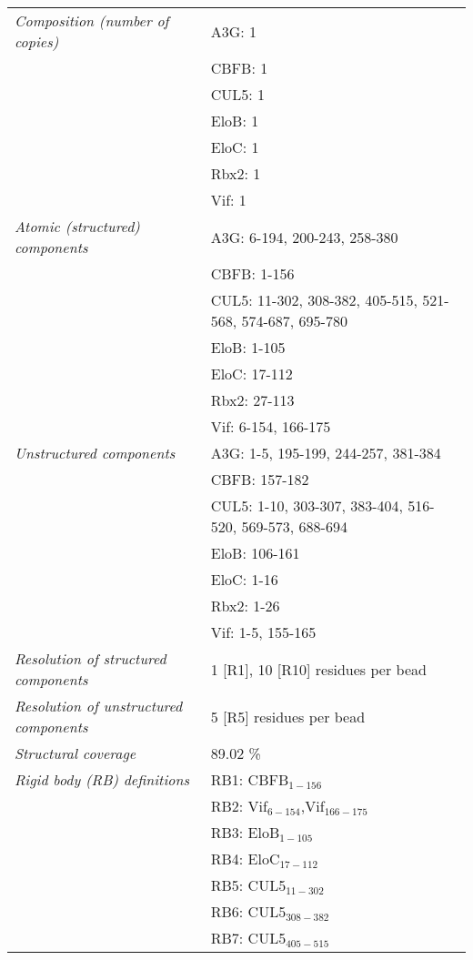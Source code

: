 \documentclass[8pt,a4paper]{article}
\begin{document}
\begin{longtable}{ p{} | p{} }
            \textit{Composition (number of copies)} & A3G: 1\\
            & CBFB: 1 \\
            & CUL5: 1 \\
            & EloB: 1 \\
            & EloC: 1 \\
            & Rbx2: 1 \\
            & Vif: 1 \\
                \textit{Atomic (structured) components} & A3G: 6-194, 200-243, 258-380\\
            & CBFB: 1-156 \\
            & CUL5: 11-302, 308-382, 405-515, 521-568, 574-687, 695-780 \\
            & EloB: 1-105 \\
            & EloC: 17-112 \\
            & Rbx2: 27-113 \\
            & Vif: 6-154, 166-175 \\
                \textit{Unstructured components} & A3G: 1-5, 195-199, 244-257, 381-384\\
            & CBFB: 157-182 \\
            & CUL5: 1-10, 303-307, 383-404, 516-520, 569-573, 688-694 \\
            & EloB: 106-161 \\
            & EloC: 1-16 \\
            & Rbx2: 1-26 \\
            & Vif: 1-5, 155-165 \\
                \textit{Resolution of structured components} & 1 [R1], 10 [R10] residues per bead\\
                \textit{Resolution of unstructured components} & 5 [R5] residues per bead\\
                \textit{Structural coverage} & 89.02 \%\\
                \textit{Rigid body (RB) definitions} & RB1: CBFB$_{1-156}$\\
            & RB2: Vif$_{6-154}$,Vif$_{166-175}$ \\
            & RB3: EloB$_{1-105}$ \\
            & RB4: EloC$_{17-112}$ \\
            & RB5: CUL5$_{11-302}$ \\
            & RB6: CUL5$_{308-382}$ \\
            & RB7: CUL5$_{405-515}$ \\

\end{longtable}
\end{document}
